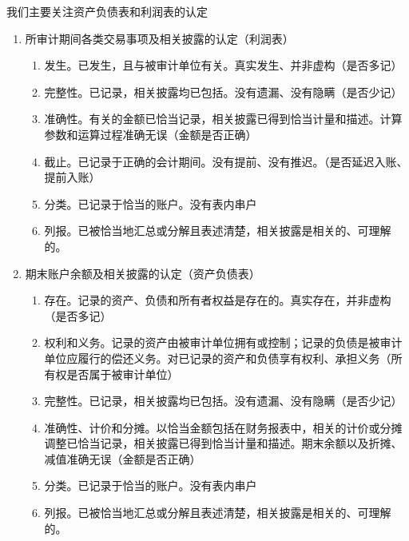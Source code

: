 \documentclass[UTF8,12pt]{ctexart}
\numberwithin{equation}{section} %
\numberwithin{figure}{section}
\numberwithin{table}{section}
\begin{document}
	我们主要关注资产负债表和利润表的认定
	\begin{enumerate}
		\item 所审计期间各类交易事项及相关披露的认定（利润表）
		\begin{enumerate}
			\item 发生。已发生，且与被审计单位有关。真实发生、并非虚构（是否多记）
			
			\item 完整性。已记录，相关披露均已包括。没有遗漏、没有隐瞒（是否少记）
			
			\item 准确性。有关的金额已恰当记录，相关披露已得到恰当计量和描述。计算参数和运算过程准确无误（金额是否正确）
			
			\item 截止。已记录于正确的会计期间。没有提前、没有推迟。（是否延迟入账、提前入账）
			
			\item 分类。已记录于恰当的账户。没有表内串户
			
			\item 列报。已被恰当地汇总或分解且表述清楚，相关披露是相关的、可理解的。
		\end{enumerate}
		
		
		
		\item 期末账户余额及相关披露的认定（资产负债表）
		\begin{enumerate}
			\item 存在。记录的资产、负债和所有者权益是存在的。真实存在，并非虚构（是否多记）
			
			\item 权利和义务。记录的资产由被审计单位拥有或控制；记录的负债是被审计单位应履行的偿还义务。对已记录的资产和负债享有权利、承担义务（所有权是否属于被审计单位）
			
			\item 完整性。已记录，相关披露均已包括。没有遗漏、没有隐瞒（是否少记）
			
			\item 准确性、计价和分摊。以恰当金额包括在财务报表中，相关的计价或分摊调整已恰当记录，相关披露已得到恰当计量和描述。期末余额以及折摊、减值准确无误（金额是否正确）
			
			\item 分类。已记录于恰当的账户。没有表内串户
			
			\item 列报。已被恰当地汇总或分解且表述清楚，相关披露是相关的、可理解的。
		\end{enumerate}
	\end{enumerate}
	
\end{document}
